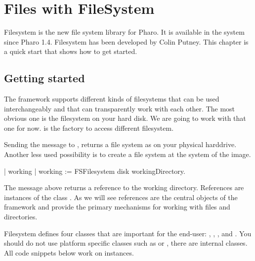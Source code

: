 \documentclass[a4paper,10pt,twoside]{book}
\begin{document}
\fi
\sloppy
\chapter{Files with FileSystem }
\chapterauthor{}

Filesystem is the new file system library for Pharo. It is available in the system since Pharo 1.4. 
Filesystem has been developed by Colin Putney. This chapter is a quick start that 
shows how to get started. 

\section{Getting started}
%

The framework supports different kinds of filesystems that can be used interchangeably and that can transparently work with each other. The most obvious one is the filesystem on your hard disk. We are going to work with that one for now. 
 is the factory to access different filesystem. 

Sending the message  to , returns a file system as on your physical harddrive. Another less used possibility is  to create a file system at the system of the image. 


\begin{code}{}
| working |
working := FSFilesystem disk workingDirectory.
\end{code} 

The message  above returns a reference to the working directory. References are instances of the class .  As we will see references are the central objects of the framework and provide the primary mechanisms for working with files and directories. 

Filesystem defines four classes that are important for the end-user: , , , and . You should do not use platform specific classes such as  or , there are internal classes. All code snippets below work on  instances.
\end{document}
